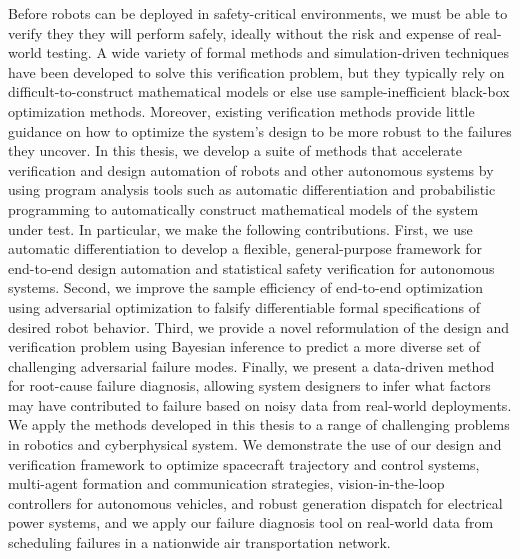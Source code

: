 %
%

Before robots can be deployed in safety-critical environments, we must be able to verify they they will perform safely, ideally without the risk and expense of real-world testing. A wide variety of formal methods and simulation-driven techniques have been developed to solve this verification problem, but they typically rely on difficult-to-construct mathematical models or else use sample-inefficient black-box optimization methods. Moreover, existing verification methods provide little guidance on how to optimize the system's design to be more robust to the failures they uncover.
%
In this thesis, we develop a suite of methods that accelerate verification and design automation of robots and other autonomous systems by using program analysis tools such as automatic differentiation and probabilistic programming to automatically construct mathematical models of the system under test. In particular, we make the following contributions. First, we use automatic differentiation to develop a flexible, general-purpose framework for end-to-end design automation and statistical safety verification for autonomous systems. Second, we improve the sample efficiency of end-to-end optimization using adversarial optimization to falsify differentiable formal specifications of desired robot behavior. Third, we provide a novel reformulation of the design and verification problem using Bayesian inference to predict a more diverse set of challenging adversarial failure modes. Finally, we present a data-driven method for root-cause failure diagnosis, allowing system designers to infer what factors may have contributed to failure based on noisy data from real-world deployments.
%
We apply the methods developed in this thesis to a range of challenging problems in robotics and cyberphysical system. We demonstrate the use of our design and verification framework to optimize spacecraft trajectory and control systems, multi-agent formation and communication strategies, vision-in-the-loop controllers for autonomous vehicles, and robust generation dispatch for electrical power systems, and we apply our failure diagnosis tool on real-world data from scheduling failures in a nationwide air transportation network.